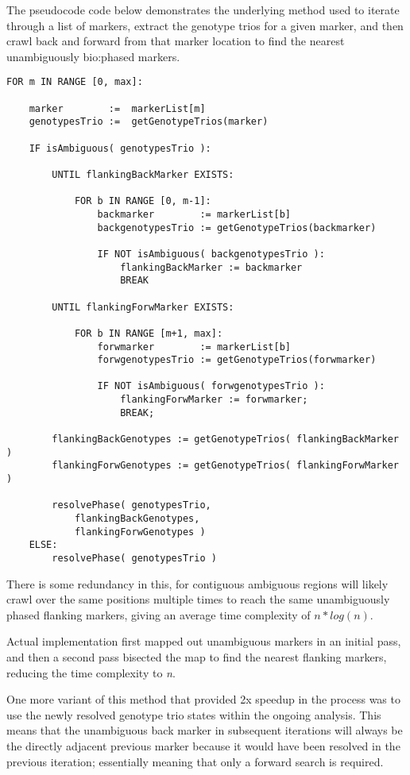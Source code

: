The pseudocode code below demonstrates the underlying method used to iterate through a list of markers, extract the genotype trios for a given marker, and then crawl back and forward from that marker location to find the nearest unambiguously \gls{bio:phased} markers.


\begingroup
\begin{spacing}{1}
\begin{lstlisting}[label=code:neighbouringjs]
FOR m IN RANGE [0, max]:

	marker        :=  markerList[m]
	genotypesTrio :=  getGenotypeTrios(marker)
	
	IF isAmbiguous( genotypesTrio ):	

		UNTIL flankingBackMarker EXISTS:

			FOR b IN RANGE [0, m-1]:
				backmarker        := markerList[b]
				backgenotypesTrio := getGenotypeTrios(backmarker)
				
				IF NOT isAmbiguous( backgenotypesTrio ):
					flankingBackMarker := backmarker
					BREAK
		
		UNTIL flankingForwMarker EXISTS:

			FOR b IN RANGE [m+1, max]:
				forwmarker        := markerList[b]
				forwgenotypesTrio := getGenotypeTrios(forwmarker)
				
				IF NOT isAmbiguous( forwgenotypesTrio ):
					flankingForwMarker := forwmarker;
					BREAK;

		flankingBackGenotypes := getGenotypeTrios( flankingBackMarker ) 
		flankingForwGenotypes := getGenotypeTrios( flankingForwMarker ) 

		resolvePhase( genotypesTrio, 
			flankingBackGenotypes, 
			flankingForwGenotypes )
	ELSE:
		resolvePhase( genotypesTrio )
\end{lstlisting}
\vspace{-10pt}
\end{spacing}
\endgroup

There is some redundancy in this, for contiguous ambiguous regions will likely crawl over the same positions multiple times to reach the same unambiguously phased flanking markers, giving an average time complexity of $n * log(n)$. 

Actual implementation first mapped out unambiguous markers in an initial pass, and then a second pass bisected the map to find the nearest flanking markers, reducing the time complexity to \textit{n}.

One more variant of this method that provided 2x speedup in the process was to use the newly resolved genotype trio states within the ongoing analysis. This means that the unambiguous back marker in subsequent iterations will always be the directly adjacent previous marker because it would have been resolved in the previous iteration; essentially meaning that only a forward search is required.


